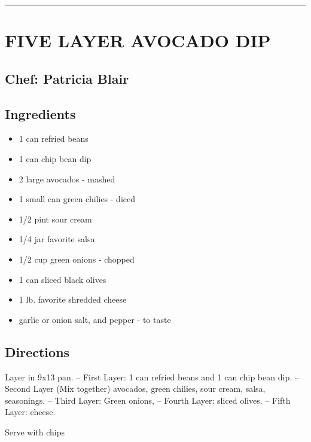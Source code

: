 \documentclass[
]{book}
\providecommand{\tightlist}{%
  \setlength{\itemsep}{0pt}\setlength{\parskip}{0pt}}
\begin{document}
\begin{center}\rule{0.5\linewidth}{0.5pt}\end{center}

\hypertarget{five-layer-avocado-dip}{%
\section*{FIVE LAYER AVOCADO DIP}\label{five-layer-avocado-dip}}


\hypertarget{chef-patricia-blair-2}{%
\subsection*{Chef: Patricia Blair}\label{chef-patricia-blair-2}}


\hypertarget{ingredients-5}{%
\subsection*{Ingredients}\label{ingredients-5}}


\begin{itemize}
\tightlist
\item
  1 can refried beans
\item
  1 can chip bean dip
\item
  2 large avocados - mashed
\item
  1 small can green chilies - diced
\item
  1/2 pint sour cream
\item
  1/4 jar favorite salsa
\item
  1/2 cup green onions - chopped
\item
  1 can sliced black olives
\item
  1 lb. favorite shredded cheese
\item
  garlic or onion salt, and pepper - to taste
\end{itemize}

\hypertarget{directions-5}{%
\subsection*{Directions}\label{directions-5}}


Layer in 9x13 pan.
-- First Layer: 1 can refried beans and 1 can chip bean dip.
-- Second Layer (Mix together) avocados, green chilies, sour cream, salsa, seasonings.
-- Third Layer: Green onions,
-- Fourth Layer: sliced olives.
-- Fifth Layer: cheese.

Serve with chips
\end{document}
